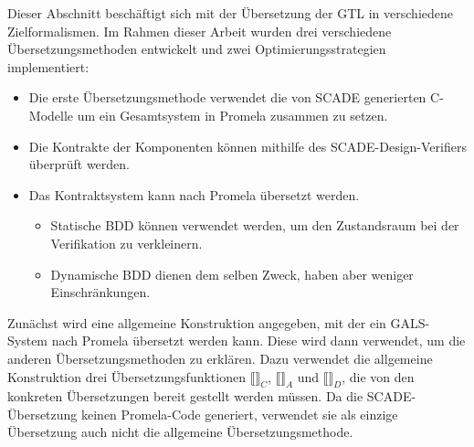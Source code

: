 Dieser Abschnitt beschäftigt sich mit der Übersetzung der GTL in verschiedene Zielformalismen.
Im Rahmen dieser Arbeit wurden drei verschiedene Übersetzungsmethoden entwickelt und zwei Optimierungsstrategien implementiert:
\begin{itemize}
\item Die erste Übersetzungsmethode verwendet die von SCADE generierten C-Modelle um ein Gesamtsystem in Promela zusammen zu setzen.
\item Die Kontrakte der Komponenten können mithilfe des SCADE-Design-Verifiers überprüft werden.
\item Das Kontraktsystem kann nach Promela übersetzt werden.
  \begin{itemize}
  \item Statische BDD können verwendet werden, um den Zustandsraum bei der Verifikation zu verkleinern.
  \item Dynamische BDD dienen dem selben Zweck, haben aber weniger Einschränkungen.
  \end{itemize}
\end{itemize}
Zunächst wird eine allgemeine Konstruktion angegeben, mit der ein GALS-System nach Promela übersetzt werden kann.
Diese wird dann verwendet, um die anderen Übersetzungsmethoden zu erklären.
Dazu verwendet die allgemeine Konstruktion drei Übersetzungsfunktionen $\llbracket\rrbracket_C$, $\llbracket\rrbracket_A$ und $\llbracket\rrbracket_D$, die von den konkreten Übersetzungen bereit gestellt werden müssen.
Da die SCADE-Übersetzung keinen Promela-Code generiert, verwendet sie als einzige Übersetzung auch nicht die allgemeine Übersetzungsmethode.